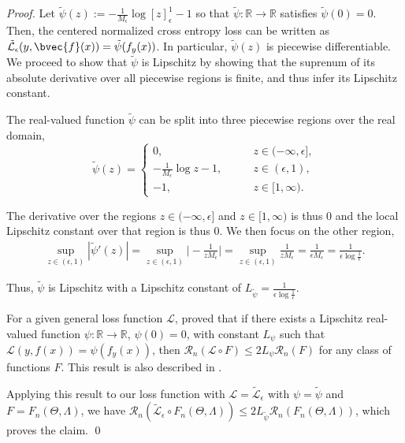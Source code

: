 \documentclass[runningheads, envcountsame, a4paper]{llncs}
\begin{document}
			\begin{proof}
				Let $\tilde{\psi}(z) := - \frac{1}{M_{\epsilon}} \log{[z]_{\epsilon}^{1}} - 1$ so that $\tilde{\psi} : \mathbb{R} \to \mathbb{R}$ satisfies $\tilde{\psi}(0) = 0$. Then, the centered normalized cross entropy loss can be written as $\tilde{\mathcal{L}}_{\epsilon}(y, \bvec{f}(x)) = \tilde{\psi}(f_{y}(x))$. In particular, $\tilde{\psi}(z)$ is piecewise differentiable. We proceed to show that $\tilde{\psi}$ is Lipschitz by showing that the suprenum of its absolute derivative over all piecewise regions is finite, and thus infer its Lipschitz constant.
				
				The real-valued function $\tilde{\psi}$ can be split into three piecewise regions over the real domain,
				\begin{equation}
					\tilde{\psi}(z) = \begin{cases}
					0, \qquad &z \in (-\infty, \epsilon], \\
					- \frac{1}{M_{\epsilon}}\log{z} - 1, \qquad & z \in (\epsilon, 1), \\
					-1, & z \in [1, \infty).
				\end{cases}
				\end{equation}
				
				The derivative over the regions $z \in (-\infty, \epsilon]$ and $z \in [1, \infty)$ is thus $0$ and the local Lipschitz constant over that region is thus $0$. We then focus on the other region,
				\begin{equation}
				\begin{aligned}
					\sup_{z \in (\epsilon, 1)} | \tilde{\psi}'(z) | = \sup_{z \in (\epsilon, 1)} \bigg| - \frac{1}{z M_{\epsilon}} \bigg| = \sup_{z \in (\epsilon, 1)} \frac{1}{z M_{\epsilon}} = \frac{1}{\epsilon M_{\epsilon}} = \frac{1}{\epsilon \log{\frac{1}{\epsilon}}}.
				\end{aligned}
				\end{equation}
				
				Thus, $\tilde{\psi}$ is Lipschitz with a Lipschitz constant of $L_{\tilde{\psi}} = \frac{1}{\epsilon \log{\frac{1}{\epsilon}}}$.
				
				For a given general loss function $\mathcal{L}$, \citet[Corollary 3.17]{ledoux2013probability} proved that if there exists a Lipschitz real-valued function $\psi : \mathbb{R} \to \mathbb{R}$, $\psi(0) = 0$, with constant $L_{\psi}$ such that $\mathcal{L}(y, f(x)) = \psi(f_{y}(x))$, then $\mathcal{R}_{n}(\mathcal{L} \circ F) \leq 2 L_{\psi} \mathcal{R}_{n}(F)$ for any class of functions $F$. This result is also described in \citet[Theorem 12.4]{bartlett2002rademacher}.
				
				Applying this result to our loss function with $\mathcal{L} = \tilde{\mathcal{L}}_{\epsilon}$ with $\psi = \tilde{\psi}$ and $F = F_{n}(\Theta, \Lambda)$, we have $\mathcal{R}_{n}(\tilde{\mathcal{L}}_{\epsilon} \circ F_{n}(\Theta, \Lambda)) \leq 2 L_{\tilde{\psi}} \mathcal{R}_{n}(F_{n}(\Theta, \Lambda))$, which proves the claim.
				\qed
			\end{proof}
		
\end{document}
